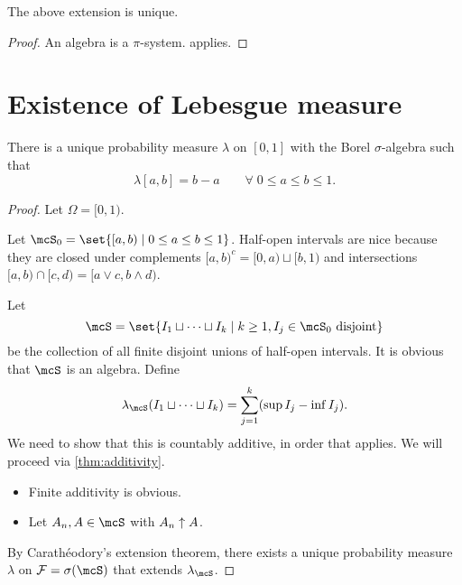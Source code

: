 \begin{corollary*}
    The above extension is unique.
\end{corollary*}
\begin{proof}
    An algebra is a $\pi$-system.
     applies.
\end{proof}

\section{Existence of Lebesgue measure} \label{sec:lebesgue}
\begin{theorem*} \label{thm:lebesgue}
    There is a unique probability measure $\lambda$ on
    $[0, 1]$ with the Borel $\sigma$-algebra such that \[
        \lambda[a, b] = b - a \qquad \forall\; 0 \le a \le b \le 1.
    \]
\end{theorem*}
\begin{proof}
    Let $\Omega = [0, 1)$.

    Let $\mcS_0 = \set{[a, b) \mid 0 \le a \le b \le 1}$.
    Half-open intervals are nice because they are closed under complements
    $[a, b)^c = [0, a) \sqcup [b, 1)$ and intersections
    $[a, b) \cap [c, d) = [a \vee c, b \wedge d)$.

    Let \[
        \mcS = \set{I_1 \sqcup \cdots \sqcup I_k
                \mid k \ge 1, I_j \in \mcS_0 \text{ disjoint}}
    \] be the collection of all finite disjoint unions of
    half-open intervals.
    It is obvious that $\mcS$ is an algebra.
    Define \[
        \lambda_\mcS(I_1 \sqcup \dots \sqcup I_k)
        = \sum_{j=1}^k (\sup I_j - \inf I_j).
    \]
    We need to show that this is countably additive, in order that
     applies.
    We will proceed via \cref{thm:additivity}.
    \begin{itemize}
        \item Finite additivity is obvious.
        \item Let $A_n, A \in \mcS$ with $A_n \uparrow A$.
    \end{itemize}
    By Carathéodory's extension theorem, there exists a unique
    probability measure $\lambda$ on $\F = \sigma(\mcS)$ that extends
    $\lambda_\mcS$.
\end{proof}

